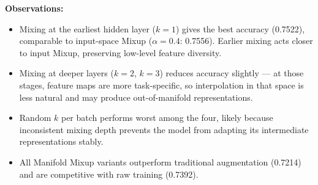 \documentclass[12pt,a4paper,onecolumn]{exam}
\begin{document}
\begin{solution}
\noindent\textbf{Observations:}
\begin{itemize}\setlength\itemsep{1pt}
    \item Mixing at the earliest hidden layer ($k=1$) gives the best accuracy (0.7522), comparable to input-space Mixup ($\alpha=0.4$: 0.7556). Earlier mixing acts closer to input Mixup, preserving low-level feature diversity.
    \item Mixing at deeper layers ($k=2$, $k=3$) reduces accuracy slightly — at those stages, feature maps are more task-specific, so interpolation in that space is less natural and may produce out-of-manifold representations.
    \item Random $k$ per batch performs worst among the four, likely because inconsistent mixing depth prevents the model from adapting its intermediate representations stably.
    \item All Manifold Mixup variants outperform traditional augmentation (0.7214) and are competitive with raw training (0.7392).
\end{itemize}

\end{solution}
\end{document}
